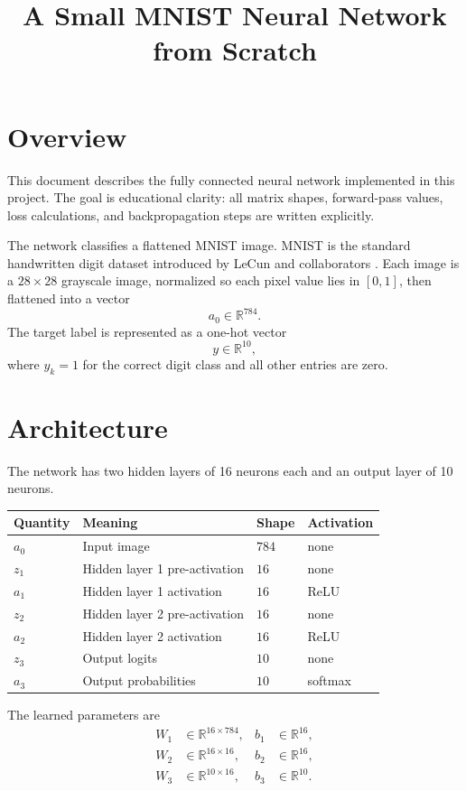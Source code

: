 \documentclass[11pt]{article}
\title{A Small MNIST Neural Network from Scratch}
\author{}
\date{}
\newcommand{\R}{\mathbb{R}}
\begin{document}
\maketitle

\section{Overview}

This document describes the fully connected neural network implemented in this
project. The goal is educational clarity: all matrix shapes, forward-pass values,
loss calculations, and backpropagation steps are written explicitly.

The network classifies a flattened MNIST image. MNIST is the standard handwritten
digit dataset introduced by LeCun and collaborators \cite{lecun1998gradient}.
Each image is a $28 \times 28$ grayscale image, normalized so each pixel value
lies in $[0,1]$, then flattened into a vector
\[
    a_0 \in \R^{784}.
\]
The target label is represented as a one-hot vector
\[
    y \in \R^{10},
\]
where $y_k = 1$ for the correct digit class and all other entries are zero.

\section{Architecture}

The network has two hidden layers of 16 neurons each and an output layer of 10
neurons.

\begin{center}
\begin{tabular}{llll}
\toprule
Quantity & Meaning & Shape & Activation \\
\midrule
$a_0$ & Input image & $784$ & none \\
$z_1$ & Hidden layer 1 pre-activation & $16$ & none \\
$a_1$ & Hidden layer 1 activation & $16$ & ReLU \\
$z_2$ & Hidden layer 2 pre-activation & $16$ & none \\
$a_2$ & Hidden layer 2 activation & $16$ & ReLU \\
$z_3$ & Output logits & $10$ & none \\
$a_3$ & Output probabilities & $10$ & softmax \\
\bottomrule
\end{tabular}
\end{center}

The learned parameters are
\[
\begin{aligned}
    W_1 &\in \R^{16 \times 784}, & b_1 &\in \R^{16}, \\
    W_2 &\in \R^{16 \times 16},  & b_2 &\in \R^{16}, \\
    W_3 &\in \R^{10 \times 16},  & b_3 &\in \R^{10}.
\end{aligned}
\]
\end{document}

